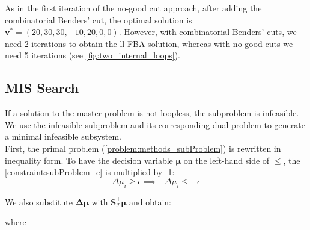 As in the first iteration of the no-good cut approach, after adding the combinatorial Benders' cut, the optimal solution is $\mathbf v^* = (20, 30, 30, -10, 20, 0, 0)$. However, with combinatorial Benders' cuts, we need 2 iterations to obtain the \textsf{ll-FBA} solution, whereas with no-good cuts we need 5 iterations (see \cref{fig:two_internal_loops}).

\subsection*{MIS Search} \label{section:methods_mis} 
If a solution to the master problem is not loopless, the subproblem is infeasible.
We use the infeasible subproblem and its corresponding dual problem to generate a minimal infeasible subsystem. \\
First, the primal problem (\cref{problem:methods_subProblem}) is rewritten in inequality form.
To have the decision variable $\boldsymbol \mu$ on the left-hand side of $\leq$, the \cref{constraint:subProblem_c} is multiplied by -1:
\begin{equation*}
    \Delta \mu_i \geq \epsilon \implies - \Delta \mu_i \leq -\epsilon
\end{equation*}

We also substitute $\boldsymbol{\Delta \mu}$ with $\mathbf S_{\mathcal{I}}^\intercal \boldsymbol \mu$
and obtain:
 where %

